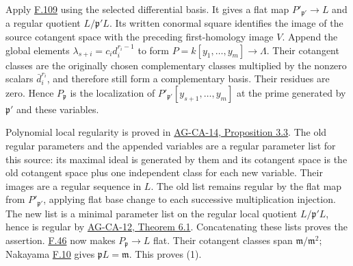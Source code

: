 \documentclass[11pt,a4paper,openany]{report}
\begin{document}
Apply \hyperref[AG-RG-S05-more-algebra-lemma-geometrically-regular-over-field]{F.109} using the selected differential basis. It gives a flat map \(P'_{\mathfrak p'}\to L\) and a regular quotient \(L/\mathfrak p'L\). Its written conormal square identifies the image of the source cotangent space with the preceding first-homology image \(V\). Append the global elements \(\lambda_{s+i}=c_id_i^{r_i-1}\) to form \(P=k[y_1,\ldots,y_m]\to\Lambda\). Their cotangent classes are the originally chosen complementary classes multiplied by the nonzero scalars \(\bar d_i^{r_i}\), and therefore still form a complementary basis. Their residues are zero. Hence \(P_{\mathfrak p}\) is the localization of \(P'_{\mathfrak p'}[y_{s+1},\ldots,y_m]\) at the prime generated by \(\mathfrak p'\) and these variables.

Polynomial local regularity is proved in \href{https://github.com/KokunoYumeto/open-math-courses/blob/d02d0a3669f42579db037cd44de1d113fdd770a1/docs/courses/AG-CA/src/regular-local-rings.md}{AG-CA-14, Proposition 3.3}. The old regular parameters and the appended variables are a regular parameter list for this source: its maximal ideal is generated by them and its cotangent space is the old cotangent space plus one independent class for each new variable. Their images are a regular sequence in \(L\). The old list remains regular by the flat map from \(P'_{\mathfrak p'}\), applying flat base change to each successive multiplication injection. The new list is a minimal parameter list on the regular local quotient \(L/\mathfrak p'L\), hence is regular by \href{https://github.com/KokunoYumeto/open-math-courses/blob/d02d0a3669f42579db037cd44de1d113fdd770a1/docs/courses/AG-CA/src/regular-sequences-depth-and-cohen-macaulay-modules.md}{AG-CA-12, Theorem 6.1}. Concatenating these lists proves the assertion. \hyperref[AG-RG-S05-algebra-lemma-flat-over-regular]{F.46} now makes \(P_{\mathfrak p}\to L\) flat. Their cotangent classes span \(\mathfrak m/\mathfrak m^2\); Nakayama \hyperref[AG-RG-S05-algebra-lemma-NAK]{F.10} gives \(\mathfrak pL=\mathfrak m\). This proves (1).
\end{document}

